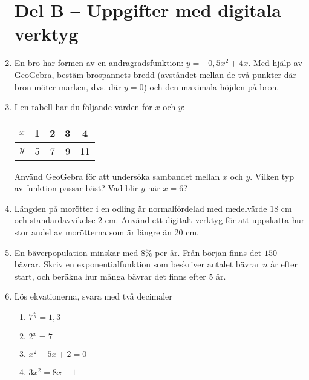 \documentclass[a4paper,11pt]{article}
\begin{document}
\begin{enumerate}[label=\arabic*.]
\newpage
\section*{Del B – Uppgifter med digitala verktyg}

\item En bro har formen av en andragradsfunktion: $y = -0,5x^2 + 4x$. Med hjälp av GeoGebra, bestäm brospannets bredd (avståndet mellan de två punkter där bron möter marken, dvs. där $y=0$) och den maximala höjden på bron.

\item I en tabell har du följande värden för $x$ och $y$:

\begin{tabular}{|c|c|c|c|c|}
\hline
$x$ & 1 & 2 & 3 & 4 \\
\hline
$y$ & 5 & 7 & 9 & 11 \\
\hline
\end{tabular}

Använd GeoGebra för att undersöka sambandet mellan $x$ och $y$. Vilken typ av funktion passar bäst? Vad blir $y$ när $x=6$?

\item Längden på morötter i en odling är normalfördelad med medelvärde $18$ cm och standardavvikelse $2$ cm. Använd ett digitalt verktyg för att uppskatta hur stor andel av morötterna som är längre än $20$ cm.

\item En bäverpopulation minskar med $8\%$ per år. Från början finns det $150$ bävrar. Skriv en exponentialfunktion som beskriver antalet bävrar $n$ år efter start, och beräkna hur många bävrar det finns efter $5$ år.

\item Lös ekvationerna, svara med två decimaler
\begin{enumerate}[label=\alph*)]
    \item $7^{\frac{x}{5}} = 1,3$
    \item $2^x = 7$
    \item $x^2 - 5x + 2 = 0$
    \item $3x^2 = 8x - 1$
\end{enumerate}

\end{enumerate}
\end{document}
